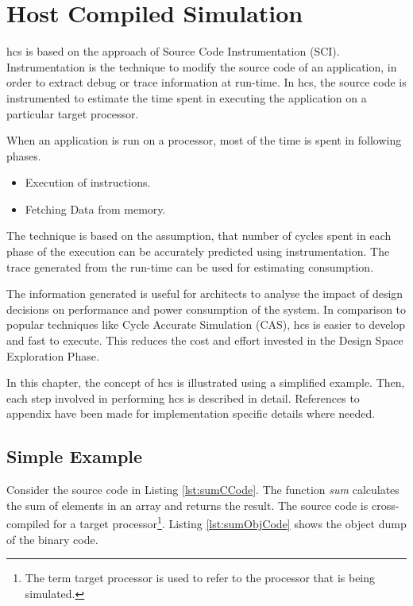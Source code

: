 \chapter{Host Compiled Simulation}

\gls{hcs} is based on the approach of Source Code Instrumentation (SCI). Instrumentation is the technique to modify the source code of an application, in order to extract debug or trace information at run-time. In \gls{hcs}, the source code is instrumented to estimate the time spent in executing the application on a particular target processor. 

When an application is run on a processor, most of the time is spent in following phases.
\begin{itemize} \itemsep -6pt
\item Execution of instructions.
\item Fetching Data from memory.
\end{itemize}

The technique is based on the assumption, that number of cycles spent in each phase of the execution can be accurately predicted using instrumentation. The trace generated from the run-time can be used for estimating consumption.

The information generated is useful for architects to analyse the impact of design decisions on performance and power consumption of the system. In comparison to popular techniques like Cycle Accurate Simulation (CAS), \gls{hcs} is easier to develop and fast to execute. This reduces the cost and effort invested in the Design Space Exploration Phase.

In this chapter, the concept of \gls{hcs} is illustrated using a simplified example. Then, each step involved in performing \gls{hcs} is described in detail. References to appendix have been made for implementation specific details where needed.

\section{Simple Example}
\label{sec:SimpleExample}
Consider the source code in Listing \ref{lst:sumCCode}. The function \emph{sum} calculates the sum of elements in an array and returns the result. The source code is cross-compiled for a target processor\footnote{The term target processor is used to refer to the processor that is being simulated.}. Listing \ref{lst:sumObjCode} shows the object dump of the binary code. 

